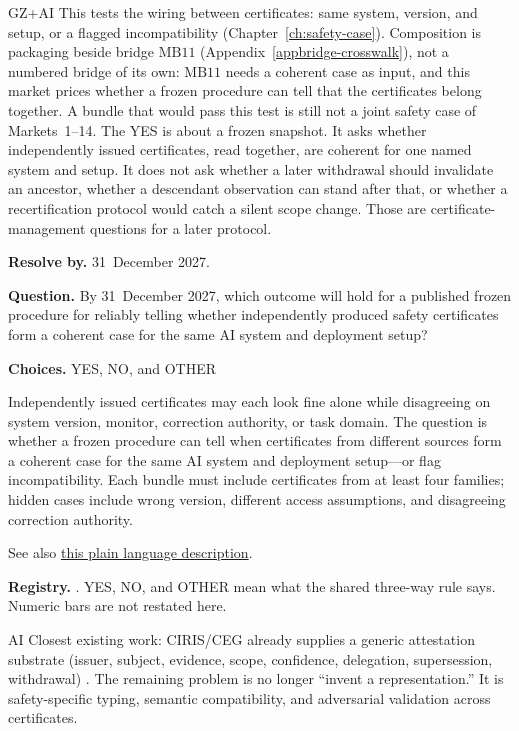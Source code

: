 \begin{authbar}{GZ+AI}
This tests the wiring between certificates: same system, version, and setup, or a flagged incompatibility (Chapter~\ref{ch:safety-case}).
Composition is packaging beside bridge \(\text{MB11}\) (Appendix~\ref{appbridge-crosswalk}), not a numbered bridge of its own: \(\text{MB11}\) needs a coherent case as input, and this market prices whether a frozen procedure can tell that the certificates belong together.
A bundle that would pass this test is still not a joint safety case of Markets~1--14.
The YES is about a frozen snapshot.
It asks whether independently issued certificates, read together, are coherent for one named system and setup.
It does not ask whether a later withdrawal should invalidate an ancestor, whether a descendant observation can stand after that, or whether a recertification protocol would catch a silent scope change.
Those are certificate-management questions for a later protocol.
\end{authbar}
\begin{predictionbox}
\textbf{Resolve by.} 31~December 2027.

\textbf{Question.}
By 31~December 2027, which outcome will hold for a published frozen procedure for reliably telling whether independently produced safety certificates form a coherent case for the same AI system and deployment setup?

\textbf{Choices.} YES, NO, and OTHER
\end{predictionbox}
\begin{predictionbackground}
Independently issued certificates may each look fine alone while disagreeing on system version, monitor, correction authority, or task domain.
The question is whether a frozen procedure can tell when certificates from different sources form a coherent case for the same AI system and deployment setup---or flag incompatibility.
Each bundle must include certificates from at least four families; hidden cases include wrong version, different access assumptions, and disagreeing correction authority.

See also \href{https://towards-alignment.com/cards/a-map-not-a-certificate/}{this plain language description}.
\end{predictionbackground}
\begin{predictionresolution}
\textbf{Registry.} . YES, NO, and OTHER mean what the shared three-way rule says. Numeric bars are not restated here.
\end{predictionresolution}
\begin{authbar}{AI}
Closest existing work: CIRIS/CEG already supplies a generic attestation substrate (issuer, subject, evidence, scope, confidence, delegation, supersession, withdrawal) \autocite{ciris2026ceg,ciris2026accord}.
The remaining problem is no longer ``invent a representation.''
It is safety-specific typing, semantic compatibility, and adversarial validation across certificates.
\end{authbar}
\authbarneedspace

